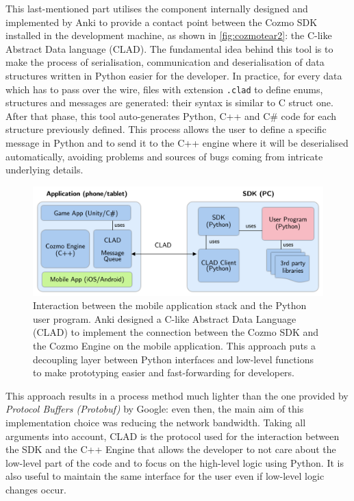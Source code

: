 This last-mentioned part utilises the component internally designed and implemented by Anki to provide a contact point between the Cozmo SDK installed in the development machine, as shown in \vref{fig:cozmotear2}: the C-like Abstract Data language (CLAD).
The fundamental idea behind this tool is to make the process of serialisation, communication and deserialisation of data structures written in Python easier for the developer.
In practice, for every data which has to pass over the wire, files with extension \texttt{.clad} to define enums, structures and messages are generated: their syntax is similar to C struct one.
After that phase, this tool auto-generates Python, C++ and C\# code for each structure previously defined.
This process allows the user to define a specific message in Python and to send it to the C++ engine where it will be deserialised automatically, avoiding problems and sources of bugs coming from intricate underlying details.

\begin{figure}
	\centering
	\includegraphics[width=\textwidth]{img/cozmo-sw.png}
	\caption[Interaction Mobile Application / Computer]{Interaction between the mobile application stack and the Python user program.
Anki designed a C-like Abstract Data Language (CLAD) to implement the connection between the Cozmo SDK and the Cozmo Engine on the mobile application.
This approach puts a decoupling layer between Python interfaces and low-level functions to make prototyping easier and fast-forwarding for developers.
\cite{mellon2017cognitive}}
	\label{fig:cozmotear2}
\end{figure}

This approach results in a process method much lighter than the one provided by \textit{Protocol Buffers (Protobuf)} by Google: even then, the main aim of this implementation choice was reducing the network bandwidth.
Taking all arguments into account, CLAD is the protocol used for the interaction between the SDK and the C++ Engine that allows the developer to not care about the low-level part of the code and to focus on the high-level logic using Python.
It is also useful to maintain the same interface for the user even if low-level logic changes occur.


